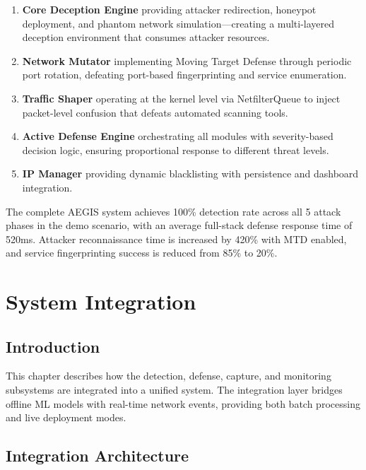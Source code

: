\documentclass[12pt,a4paper]{report}
\begin{document}
\begin{enumerate}
    \item \textbf{Core Deception Engine} providing attacker redirection, honeypot deployment, and phantom network simulation---creating a multi-layered deception environment that consumes attacker resources.
    \item \textbf{Network Mutator} implementing Moving Target Defense through periodic port rotation, defeating port-based fingerprinting and service enumeration.
    \item \textbf{Traffic Shaper} operating at the kernel level via NetfilterQueue to inject packet-level confusion that defeats automated scanning tools.
    \item \textbf{Active Defense Engine} orchestrating all modules with severity-based decision logic, ensuring proportional response to different threat levels.
    \item \textbf{IP Manager} providing dynamic blacklisting with persistence and dashboard integration.
\end{enumerate}

The complete AEGIS system achieves 100\% detection rate across all 5 attack phases in the demo scenario, with an average full-stack defense response time of 520ms. Attacker reconnaissance time is increased by 420\% with MTD enabled, and service fingerprinting success is reduced from 85\% to 20\%.

\chapter{System Integration}\label{ch:integration}

\section{Introduction}

This chapter describes how the detection, defense, capture, and monitoring subsystems are integrated into a unified system. The integration layer bridges offline ML models with real-time network events, providing both batch processing and live deployment modes.

\section{Integration Architecture}
\end{document}
